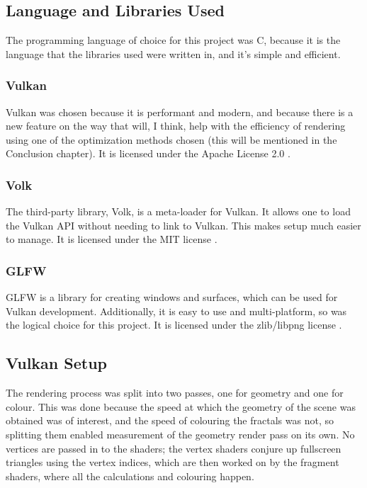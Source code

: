 \subsection{Language and Libraries Used}

The programming language of choice for this project was C, because it is the language that the libraries used were written in, and it's simple and efficient.

\subsubsection{Vulkan}

Vulkan was chosen because it is performant and modern, and because there is a new feature on the way that will, I think, help with the efficiency of rendering using one of the optimization methods chosen (this will be mentioned in the Conclusion chapter). It is licensed under the Apache License 2.0 \cite{licensing-vulkan}.

\subsubsection{Volk}

The third-party library, Volk, is a meta-loader for Vulkan. It allows one to load the Vulkan API without needing to link to Vulkan. This makes setup much easier to manage. It is licensed under the MIT license \cite{licensing-volk}.

\subsubsection{GLFW}

GLFW is a library for creating windows and surfaces, which can be used for Vulkan development. Additionally, it is easy to use and multi-platform, so was the logical choice for this project. It is licensed under the zlib/libpng license \cite{licensing-glfw}.

\subsection{Vulkan Setup}

The rendering process was split into two passes, one for geometry and one for colour. This was done because the speed at which the geometry of the scene was obtained was of interest, and the speed of colouring the fractals was not, so splitting them enabled measurement of the geometry render pass on its own. No vertices are passed in to the shaders; the vertex shaders conjure up fullscreen triangles using the vertex indices, which are then worked on by the fragment shaders, where all the calculations and colouring happen.\newline

